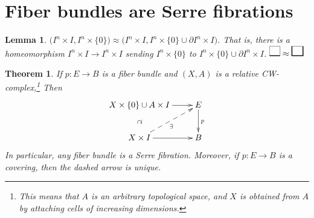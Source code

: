 \documentclass[12pt]{article}
\theoremstyle{plain}
\newtheorem{theorem}[equation]{Theorem}
\newtheorem{lemma}[equation]{Lemma}
\theoremstyle{definition}
\theoremstyle{remark}
\begin{document}
 \section{Fiber bundles are Serre fibrations}
 \begin{lemma}\label{L:RelIsomorphismI^n}
   $\bigl(I^n\times I,I^n\times \{0\}\bigr) \approx \bigl( I^n\times I, I^n\times \{0\}
   \cup \partial I^n\times I\bigr)$. That is, there is a homeomorphism $I^n\times I\to
   I^n\times I$ sending $I^n\times \{0\}$ to $I^n\times \{0\} \cup \partial I^n\times I$.
   \qquad
   $\rule{.3pt}{12.2pt}\rule{12pt}{1pt}\llap{\rule[12pt]{12pt}{.3pt}}\rule{.3pt}{12.2pt}
   \approx
   \rule{1pt}{12.2pt}\rule{12pt}{1pt}\llap{\rule[12pt]{12pt}{.3pt}}\rule{1pt}{12.2pt}$
 \end{lemma}
 \begin{theorem}
   If $p:E\to B$ is a fiber bundle and $(X,A)$ is a relative CW-complex,\footnote{This
   means that $A$ is an arbitrary topological space, and $X$ is obtained from $A$ by
   attaching cells of increasing dimensions.} Then
   \[\xymatrix{
    X\times \{0\} \cup A \times I \ar@{}[d]|{\cap\rule{.3pt}{5pt}} \ar[r] & E\ar[d]^p\\
    X\times I\ar[r] \ar@{-->}[ur]_{\exists} & B
   }\]
    In particular, any fiber bundle is a Serre fibration. Moreover, if $p:E\to B$ is a
    covering, then the dashed arrow is unique.
 \end{theorem}
\end{document}
